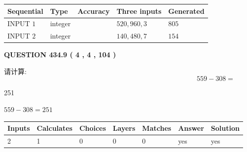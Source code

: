 \documentclass{ctexart}
\begin{document}
   
  
  
\noindent\begin{tabular}{|l|l|l|l|l|}
\hline
 Sequential & Type & Accuracy & Three inputs & Generated \\ 
\hline
 
 
  INPUT $  1 $ & integer &  & $
 520
 , 
 960
 , 
 3
 $ & $ 805 $ 
 \\  \hline  
 
 
  INPUT $  2 $ & integer &  & $
 140
 , 
 480
 , 
 7
 $ & $ 154 $ 
 \\  \hline  
 \end{tabular}
   
   
  
\vspace{0.2in}
  
{\textbf{\Large{QUESTION
434.9 
 ( 4 , 4 , 104 )
}}}
  
  
 
请计算:
\begin{equation}
559 -   %
308 = \nonumber
\end{equation}
 
 
 
\noindent{}
 
 

251
 
 
\noindent{}
 
 

 
 
 
\noindent{}
 
 

$ %
559 -  %
308=   %
251$
 
 
\noindent{}
 
 

 
   
   
   
   
\noindent\begin{tabular}{|l|l|l|l|l|l|l|}
 \hline
Inputs & Calculates & Choices & Layers & Matches & Answer & Solution \\ \hline
 2  & 
 1  & 
 0
  & 
 0  & 
 0  & 
  yes & 
  yes 
  \\ \hline
 \end{tabular}
   
\end{document}
